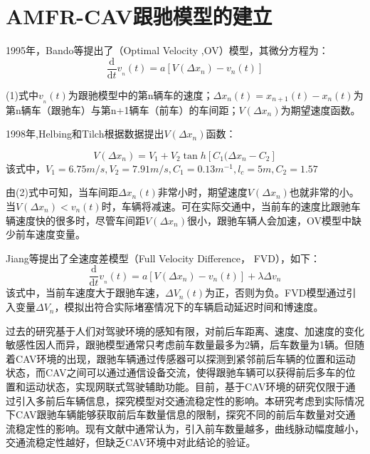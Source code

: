 \documentclass[final,5p,times,twocolumn,authoryear]{elsarticle}
\begin{document}



\section{AMFR-CAV跟驰模型的建立}
\label{introduction}

1995年，Bando等提出了（Optimal Velocity ,OV）模型，其微分方程为：
\begin{equation}\label{eqn:1}
    \frac{\mathrm{d}}{\mathrm{d}t}v_{_{n} } (t)=a[V(\Delta  x_{n} )-v_{n}(t)]
\end{equation}
\par
(1)式中$v_{_{n} } (t)$为跟驰模型中的第n辆车的速度；$\Delta x_n(t)=x_{n+1}(t)-x_{n}(t)$为第n辆车（跟驰车）与第n+1辆车（前车）的车间距；$V(\Delta  x_{n} )$为期望速度函数。
\par
1998年,Helbing和Tilch根据数据提出$V(\Delta  x_{n} )$函数：
\par
\begin{equation}
    V(\Delta  x_{n} )=V_{1}+V_{2}\tan{h}[C_{1}(\Delta x_{n}-C_{2}]
\end{equation}
该式中，$V_{1}=6.75m/s, V_{2}=7.91m/s, C_{1}=0.13m^{-1}, l_{c}=5m, C_{2}=1.57$
\par
由(2)式中可知，当车间距$\Delta x_{n}(t)$非常小时，期望速度$V(\Delta  x_{n} )$也就非常的小。当$V(\Delta  x_{n} )<v_{n}(t)$时，车辆将减速。可在实际交通中，当前车的速度比跟驰车辆速度快的很多时，尽管车间距$V(\Delta  x_{n} )$很小，跟驰车辆人会加速，OV模型中缺少前车速度变量。
\par
Jiang等提出了全速度差模型（Full Velocity Difference， FVD），如下：
\begin{equation}
    \frac{\mathrm{d}}{\mathrm{d}t}v_{_{n} } (t)=a[V(\Delta  x_{n} )-v_{n}(t)]+\lambda\Delta v_{n}
\end{equation}
该式中，当前车速度大于跟驰车速，$\Delta V_{n}(t)$为正，否则为负。FVD模型通过引入变量$\Delta V_{n}$，模拟出符合实际堵塞情况下的车辆启动延迟时间和博速度。
\par
过去的研究基于人们对驾驶环境的感知有限，对前后车距离、速度、加速度的变化敏感性因人而异，跟驰模型通常只考虑前车数量最多为2辆，后车数量为1辆。但随着CAV环境的出现，跟驰车辆通过传感器可以探测到紧邻前后车辆的位置和运动状态，而CAV之间可以通过通信设备交流，使得跟驰车辆可以获得前后多车的位置和运动状态，实现网联式驾驶辅助功能。目前，基于CAV环境的研究仅限于通过引入多前后车辆信息，探究模型对交通流稳定性的影响。本研究考虑到实际情况下CAV跟驰车辆能够获取前后车数量信息的限制，探究不同的前后车数量对交通流稳定性的影响。现有文献中通常认为，引入前车数量越多，曲线脉动幅度越小，交通流稳定性越好，但缺乏CAV环境中对此结论的验证。
\par
\end{document}
